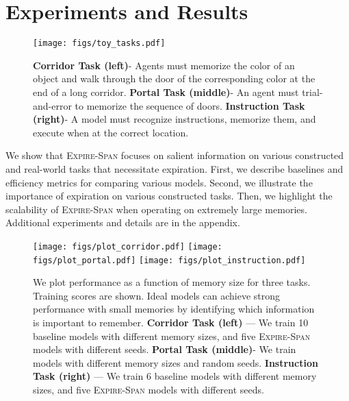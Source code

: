 \section{Experiments and Results}

\begin{figure*}[t]
    \centering
    \texttt{[image: figs/toy\_tasks.pdf]}
    \caption{\textbf{Corridor Task (left)}- Agents must memorize the color of an object and walk through the door of the corresponding color at the end of a long corridor. \textbf{Portal Task (middle)}- An agent must trial-and-error to memorize the  sequence of doors. \textbf{Instruction Task (right)}- A model must recognize instructions, memorize them, and execute when at the correct location.}
    \label{fig:corridor_img}
\end{figure*}

We show that \textsc{Expire-Span} focuses on salient information on various constructed and real-world tasks that necessitate expiration. First, we describe baselines and efficiency metrics for comparing various models. Second, we illustrate the importance of expiration on various constructed tasks. Then, we highlight the scalability of \textsc{Expire-Span} when operating on extremely large memories.
Additional experiments and details are in the appendix.


\begin{figure*}[t]
    \texttt{[image: figs/plot\_corridor.pdf]}
    \hspace{0.3cm}
    \texttt{[image: figs/plot\_portal.pdf]}
    \hspace{0.3cm}
    \texttt{[image: figs/plot\_instruction.pdf]}
    \hspace{0.3cm}
    \vspace{-3mm}
    \caption{We plot performance as a function of memory size for three tasks. Training scores are shown. Ideal models can achieve strong performance with small memories by identifying which information is important to remember. \textbf{Corridor Task (left)} --- We train 10 baseline models with different memory sizes, and five \textsc{Expire-Span} models with different seeds. 
    \textbf{Portal Task (middle)}- We train models with different memory sizes and random seeds. \textbf{Instruction Task (right)} --- We train 6 baseline models with different memory sizes, and five \textsc{Expire-Span} models with different seeds.}
    \label{fig:corridor_result}
\end{figure*}

